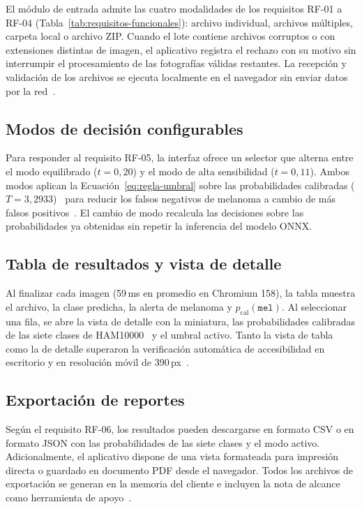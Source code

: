 El módulo de entrada admite las cuatro modalidades de los requisitos RF-01 a RF-04 (Tabla~\ref{tab:requisitos-funcionales}): archivo individual, archivos múltiples, carpeta local o archivo ZIP. Cuando el lote contiene archivos corruptos o con extensiones distintas de imagen, el aplicativo registra el rechazo con su motivo sin interrumpir el procesamiento de las fotografías válidas restantes. La recepción y validación de los archivos se ejecuta localmente en el navegador sin enviar datos por la red~\cite{ning2024onnxweb}.

\subsection{Modos de decisión configurables}

Para responder al requisito RF-05, la interfaz ofrece un selector que alterna entre el modo equilibrado ($t = 0{,}20$) y el modo de alta sensibilidad ($t = 0{,}11$). Ambos modos aplican la Ecuación~\ref{eq:regla-umbral} sobre las probabilidades calibradas ($T = 3{,}2933$)~\cite{guo2017calibration} para reducir los falsos negativos de melanoma a cambio de más falsos positivos~\cite{barata2023reinforcement,marchetti2023proveai}. El cambio de modo recalcula las decisiones sobre las probabilidades ya obtenidas sin repetir la inferencia del modelo ONNX.

\subsection{Tabla de resultados y vista de detalle}

Al finalizar cada imagen (59\,ms en promedio en Chromium 158), la tabla muestra el archivo, la clase predicha, la alerta de melanoma y $p_{\text{cal}}(\texttt{mel})$. Al seleccionar una fila, se abre la vista de detalle con la miniatura, las probabilidades calibradas de las siete clases de HAM10000~\cite{tschandl2018ham10000} y el umbral activo. Tanto la vista de tabla como la de detalle superaron la verificación automática de accesibilidad en escritorio y en resolución móvil de 390\,px~\cite{w3c2023wcag22}.

\subsection{Exportación de reportes}

Según el requisito RF-06, los resultados pueden descargarse en formato CSV o en formato JSON con las probabilidades de las siete clases y el modo activo. Adicionalmente, el aplicativo dispone de una vista formateada para impresión directa o guardado en documento PDF desde el navegador. Todos los archivos de exportación se generan en la memoria del cliente e incluyen la nota de alcance como herramienta de apoyo~\cite{amaral2025esmo}.

